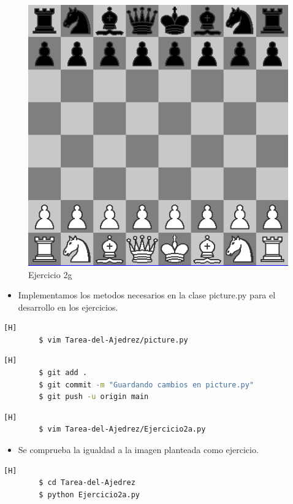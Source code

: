 \documentclass{article}
\begin{document}
	\clearpage
	\begin{figure}
	    \centering
	    \includegraphics[width=0.5\linewidth]{img/ejercicio_02_g.png}
	    \caption{Ejercicio 2g}
	    \label{fig:7}
	\end{figure}
\begin{itemize}
    \item Implementamos los metodos necesarios en la clase picture.py para el desarrollo en los ejercicios.
\end{itemize}

 \begin{lstlisting}[language=bash,caption={Modificando picture.py}][H]
		$ vim Tarea-del-Ajedrez/picture.py
	\end{lstlisting}
	
	
\clearpage
	\begin{lstlisting}[language=bash,caption={Commit: Guardando cambios en picture.py}][H]
		$ git add .
		$ git commit -m "Guardando cambios en picture.py"			
		$ git push -u origin main
	\end{lstlisting}
 
 \begin{lstlisting}[language=bash,caption={Creando Ejercicio2a.py}][H]
		$ vim Tarea-del-Ajedrez/Ejercicio2a.py
	\end{lstlisting}
	
	
\begin{itemize}
    \item  Se comprueba la igualdad a la imagen planteada como ejercicio.
\end{itemize}

	\begin{lstlisting}[language=bash,caption={Probando código}][H]
		$ cd Tarea-del-Ajedrez
		$ python Ejercicio2a.py
	\end{lstlisting}
 
\end{document}
